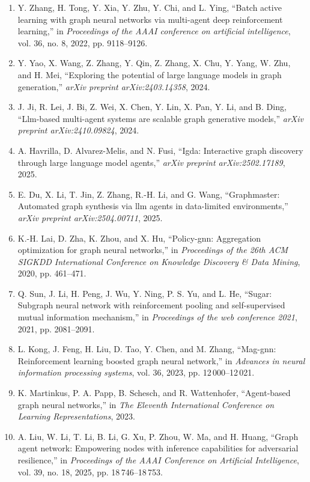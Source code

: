 \documentclass[10pt,UTF8,fontset=fandol]{ctexart}
\begin{document}
\begin{enumerate}[leftmargin=2.4em,labelsep=0.4em,itemsep=0.15em]
\item Y. Zhang, H. Tong, Y. Xia, Y. Zhu, Y. Chi, and L. Ying, ``Batch active learning with graph neural networks via multi-agent deep reinforcement learning,'' in \textit{Proceedings of the AAAI conference on artificial intelligence}, vol. 36, no. 8, 2022, pp. 9118--9126.
\item Y. Yao, X. Wang, Z. Zhang, Y. Qin, Z. Zhang, X. Chu, Y. Yang, W. Zhu, and H. Mei, ``Exploring the potential of large language models in graph generation,'' \textit{arXiv preprint arXiv:2403.14358}, 2024.
\item J. Ji, R. Lei, J. Bi, Z. Wei, X. Chen, Y. Lin, X. Pan, Y. Li, and B. Ding, ``Llm-based multi-agent systems are scalable graph generative models,'' \textit{arXiv preprint arXiv:2410.09824}, 2024.
\item A. Havrilla, D. Alvarez-Melis, and N. Fusi, ``Igda: Interactive graph discovery through large language model agents,'' \textit{arXiv preprint arXiv:2502.17189}, 2025.
\item E. Du, X. Li, T. Jin, Z. Zhang, R.-H. Li, and G. Wang, ``Graphmaster: Automated graph synthesis via llm agents in data-limited environments,'' \textit{arXiv preprint arXiv:2504.00711}, 2025.
\item K.-H. Lai, D. Zha, K. Zhou, and X. Hu, ``Policy-gnn: Aggregation optimization for graph neural networks,'' in \textit{Proceedings of the 26th ACM SIGKDD International Conference on Knowledge Discovery \& Data Mining}, 2020, pp. 461--471.
\item Q. Sun, J. Li, H. Peng, J. Wu, Y. Ning, P. S. Yu, and L. He, ``Sugar: Subgraph neural network with reinforcement pooling and self-supervised mutual information mechanism,'' in \textit{Proceedings of the web conference 2021}, 2021, pp. 2081--2091.
\item L. Kong, J. Feng, H. Liu, D. Tao, Y. Chen, and M. Zhang, ``Mag-gnn: Reinforcement learning boosted graph neural network,'' in \textit{Advances in neural information processing systems}, vol. 36, 2023, pp. 12\,000--12\,021.
\item K. Martinkus, P. A. Papp, B. Schesch, and R. Wattenhofer, ``Agent-based graph neural networks,'' in \textit{The Eleventh International Conference on Learning Representations}, 2023.
\item A. Liu, W. Li, T. Li, B. Li, G. Xu, P. Zhou, W. Ma, and H. Huang, ``Graph agent network: Empowering nodes with inference capabilities for adversarial resilience,'' in \textit{Proceedings of the AAAI Conference on Artificial Intelligence}, vol. 39, no. 18, 2025, pp. 18\,746--18\,753.

\end{enumerate}
\end{document}
